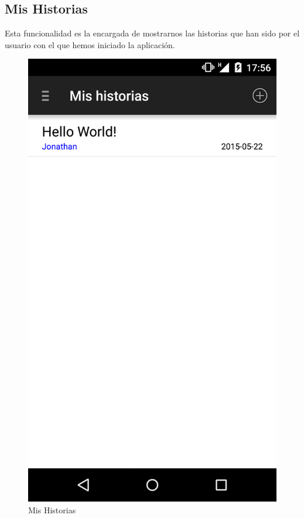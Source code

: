 \documentclass[11pt,a4paper, titlepage]{article}
\begin{document}
	\FloatBarrier
	
	\newpage
	\subsection[Mis Historias]{Mis Historias}
	Esta funcionalidad es la encargada de mostrarnos las historias que han sido por el usuario con el que hemos iniciado la aplicación.
	
	\begin{figure}[hbtp]
		\centering
		\includegraphics[scale = 0.18 ]{img/5}
		\caption{Mis Historias}
		\label{p12}
	\end{figure}
	
\end{document}
